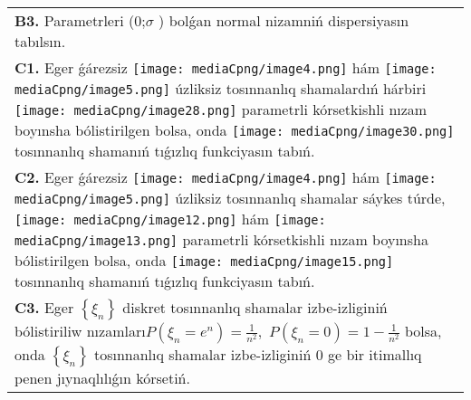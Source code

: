 \documentclass{article}
\begin{document}
\begin{tabular}{m{17cm}}
 \\
\textbf{B3.} Parametrleri (0;$\sigma$ ) bolǵan normal nizamniń dispersiyasın tabılsın.
 \\
\textbf{C1.} Eger ǵárezsiz \texttt{[image: mediaCpng/image4.png]} hám \texttt{[image: mediaCpng/image5.png]} úzliksiz tosınnanlıq shamalardıń hárbiri \texttt{[image: mediaCpng/image28.png]} parametrli kórsetkishli nızam boyınsha bólistirilgen bolsa, onda \texttt{[image: mediaCpng/image30.png]} tosınnanlıq shamanıń tıǵızlıq funkciyasın tabıń.
 \\
\textbf{C2.} Eger ǵárezsiz \texttt{[image: mediaCpng/image4.png]} hám \texttt{[image: mediaCpng/image5.png]} úzliksiz tosınnanlıq shamalar sáykes túrde, \texttt{[image: mediaCpng/image12.png]} hám \texttt{[image: mediaCpng/image13.png]} parametrli kórsetkishli nızam boyınsha bólistirilgen bolsa, onda \texttt{[image: mediaCpng/image15.png]} tosınnanlıq shamanıń tıǵızlıq funkciyasın tabıń.
 \\
\textbf{C3.} Eger \(\left\{ \xi_{n} \right\}\) diskret tosınnanlıq shamalar izbe-izliginiń bólistiriliw nızamları\(P(\xi_{n} = e^{n}) = \frac{1}{n^{2}},\) \(P(\xi_{n} = 0) = 1 - \frac{1}{n^{2}}\) bolsa, onda \(\left\{ \xi_{n} \right\}\) tosınnanlıq shamalar izbe-izliginiń 0 ge bir itimallıq penen jıynaqlılıǵın kórsetiń.
 \\

\end{tabular}
\vspace{1cm}
\end{document}
